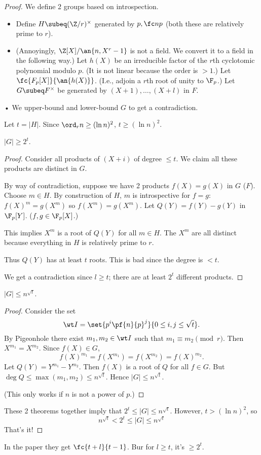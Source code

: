 \begin{proof}
We define 2 groups based on introspection.
\begin{itemize}
\item
Define $H\subeq (\Z/r)^{\times}$ generated by $p,\fc np$ (both these are relatively prime to $r$).
\item
(Annoyingly, $\Z[X]/\an{n,X^{r}-1}$ is not a field. We convert it to a field in the following way.)
Let $h(X)$ be an irreducible factor of the $r$th cyclotomic polynomial modulo $p$. (It is not linear because the order is $>1$.)
Let $\fc{F_p[X]}{\an{h(X)}}$. (I.e., adjoin a $r$th root of unity to $\F_p$.)
Let $G\subeq F^{\times}$ be generated by $(X+1),\ldots, (X+l)$ in $F$.
\end{itemize}•
We upper-bound and lower-bound $G$ to get a contradiction.

Let $t=|H|$. Since $\ord_r n \ge (\ln n)^2$, $t\ge (\ln n)^2$.
\begin{thm}
$|G|\ge 2^t$.
\end{thm}
\begin{proof}
Consider all products of $(X+i)$ of degree $\le t$. We claim all these products are distinct in $G$. 

By way of contradiction, suppose we have 2 products $f(X)=g(X)$ in $G$ ($F$). Choose $m\in H$. By construction of $H$, $m$ is introspective for $f=g$: $f(X)^m=g(X^m)$ so $f(X^m)=g(X^m)$. %
Let $Q(Y)=f(Y)-g(Y)$ in $\F_p[Y]$. ($f,g\in \F_p[X]$.)

This implies $X^m$ is a root of $Q(Y)$ for all $m\in H$. The $X^m$ are all distinct because everything in $H$ is relatively prime to $r$.

Thus $Q(Y)$ has at least $t$ roots. This is bad since the degree is $<t$. %

We get a contradiction since $l\ge t$; there are at least $2^t$ different products.
\end{proof}
\begin{thm}
$|G|\le n^{\sqrt t}$.
\end{thm}
\begin{proof}
Consider the set
\[
\wt I = \set{p^i\pf{n}{p}^j}{0\le i,j\le \sqrt t}.
\]
By Pigeonhole there exist $m_1,m_2\in \wt I$ such that $m_1\equiv m_2\pmod r$.
Then $X^{m_1}=X^{m_2}$. 
Since $f(X)\in G$,
\[
f(X)^{m_1}=f(X^{m_1})=f(X^{m_2}) = f(X)^{m_2}.
\]
Let $Q(Y)=Y^{m_1}-Y^{m_2}$. Then $f(X)$ is a root of $Q$ for all $f\in G$. But $\deg Q\le \max (m_1,m_2)\le n^{\sqrt t}$. Hence $|G|\le n^{\sqrt t}$.

(This only works if $n$ is not a power of $p$.)
\end{proof}
These 2 theorems together imply that $2^t\le |G|\le n^{\sqrt t}$. However, $t> (\ln n)^2$, so 
\[
n^{\sqrt t}< 2^t\le |G|\le n^{\sqrt t}
\]
That's it!
\end{proof}
In the paper they get $\fc{t+l}{t-1}$. Bur for $l\ge t$, it's $\ge 2^t$.

